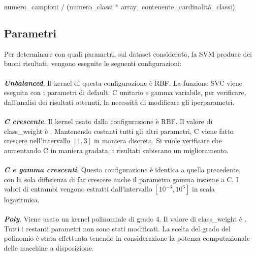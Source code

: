 \documentclass[12pt,a4paper,oneside,hidelinks]{report}
\begin{document}
\begin{center}
numero\_campioni / (numero\_classi * array\_contenente\_cardinalità\_classi)
\end{center}


\subsection{Parametri}
Per determinare con quali parametri, sul dataset considerato, la SVM produce dei buoni risultati, vengono eseguite le seguenti configurazioni:

\paragraph*{}
\textbf{\textit{Unbalanced}}. Il kernel di questa configurazione è RBF. La funzione SVC viene eseguita con i parametri di default, C unitario e gamma variabile, per verificare, dall'analisi dei risultati ottenuti, la necessità di modificare gli iperparametri.

\paragraph*{}
\textbf{\textit{C crescente}}. Il kernel usato dalla configurazione è RBF. Il valore di class\_weight è . Mantenendo costanti tutti gli altri parametri, C viene fatto crescere nell'intervallo $[1,3]$ in maniera discreta. Si vuole verificare che aumentando C in maniera gradata, i risultati subiscano un miglioramento.

\paragraph*{}
\textbf{\textit{C e gamma crescenti}}. Questa configurazione è identica a quella precedente, con la sola differenza di far crescere anche il parametro gamma insieme a C. I valori di entrambi vengono estratti dall'intervallo $[10^{-3}, 10^3]$ in scala logaritmica.

\paragraph*{}
\textbf{\textit{Poly}}. Viene usato un kernel polinomiale di grado 4. Il valore di class\_weight è . Tutti i restanti parametri non sono stati modificati. La scelta del grado del polinomio è stata effettuata tenendo in considerazione la potenza computazionale delle macchine a disposizione.
\end{document}
